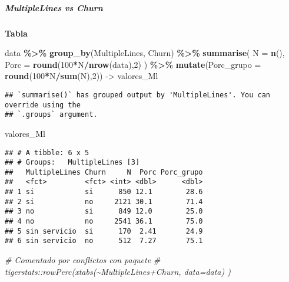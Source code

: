 \documentclass[
]{article}
\newenvironment{Shaded}{\begin{snugshade}}{\end{snugshade}}
\newcommand{\AttributeTok}[1]{\textcolor[rgb]{0.13,0.29,0.53}{#1}}
\newcommand{\CommentTok}[1]{\textcolor[rgb]{0.56,0.35,0.01}{\textit{#1}}}
\newcommand{\DecValTok}[1]{\textcolor[rgb]{0.00,0.00,0.81}{#1}}
\newcommand{\FunctionTok}[1]{\textcolor[rgb]{0.13,0.29,0.53}{\textbf{#1}}}
\newcommand{\NormalTok}[1]{#1}
\newcommand{\OtherTok}[1]{\textcolor[rgb]{0.56,0.35,0.01}{#1}}
\newcommand{\SpecialCharTok}[1]{\textcolor[rgb]{0.81,0.36,0.00}{\textbf{#1}}}
\begin{document}
\hypertarget{multiplelines-vs-churn}{%
\subparagraph{MultipleLines vs Churn}\label{multiplelines-vs-churn}}

\textbf{Tabla}

\begin{Shaded}
\begin{Highlighting}[]
\NormalTok{data }\SpecialCharTok{\%\textgreater{}\%}
  \FunctionTok{group\_by}\NormalTok{(MultipleLines, Churn) }\SpecialCharTok{\%\textgreater{}\%}
  \FunctionTok{summarise}\NormalTok{(}
    \AttributeTok{N =} \FunctionTok{n}\NormalTok{(),}
    \AttributeTok{Porc =} \FunctionTok{round}\NormalTok{(}\DecValTok{100}\SpecialCharTok{*}\NormalTok{N}\SpecialCharTok{/}\FunctionTok{nrow}\NormalTok{(data),}\DecValTok{2}\NormalTok{)}
\NormalTok{  ) }\SpecialCharTok{\%\textgreater{}\%}
  \FunctionTok{mutate}\NormalTok{(}\AttributeTok{Porc\_grupo =} \FunctionTok{round}\NormalTok{(}\DecValTok{100}\SpecialCharTok{*}\NormalTok{N}\SpecialCharTok{/}\FunctionTok{sum}\NormalTok{(N),}\DecValTok{2}\NormalTok{)) }\OtherTok{{-}\textgreater{}}\NormalTok{ valores\_Ml}
\end{Highlighting}
\end{Shaded}

\begin{verbatim}
## `summarise()` has grouped output by 'MultipleLines'. You can override using the
## `.groups` argument.
\end{verbatim}

\begin{Shaded}
\begin{Highlighting}[]
\NormalTok{valores\_Ml}
\end{Highlighting}
\end{Shaded}

\begin{verbatim}
## # A tibble: 6 x 5
## # Groups:   MultipleLines [3]
##   MultipleLines Churn     N  Porc Porc_grupo
##   <fct>         <fct> <int> <dbl>      <dbl>
## 1 si            si      850 12.1        28.6
## 2 si            no     2121 30.1        71.4
## 3 no            si      849 12.0        25.0
## 4 no            no     2541 36.1        75.0
## 5 sin servicio  si      170  2.41       24.9
## 6 sin servicio  no      512  7.27       75.1
\end{verbatim}

\begin{Shaded}
\begin{Highlighting}[]
\CommentTok{\# Comentado por conflictos con paquete}
\CommentTok{\# tigerstats::rowPerc(xtabs(\textasciitilde{}MultipleLines+Churn, data=data) )}
\end{Highlighting}
\end{Shaded}
\end{document}
